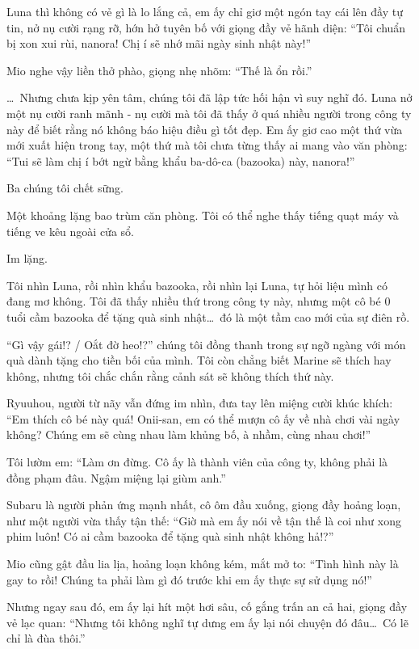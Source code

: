 \documentclass[../main.tex]{subfiles}
\begin{document}

Luna thì không có vẻ gì là lo lắng cả, em ấy chỉ giơ một ngón tay cái lên đầy tự tin, nở nụ cười rạng rỡ, hớn hở tuyên bố với giọng đầy vẻ hãnh diện: ``Tôi chuẩn bị xon xui rùi, nanora! Chị í sẽ nhớ mãi ngày sinh nhật này!''

Mio nghe vậy liền thở phào, giọng nhẹ nhõm: ``Thế là ổn rồi.''

\dots\ Nhưng chưa kịp yên tâm, chúng tôi đã lập tức hối hận vì suy nghĩ đó. Luna nở một nụ cười ranh mãnh - nụ cười mà tôi đã thấy ở quá nhiều người trong công ty này để biết rằng nó không báo hiệu điều gì tốt đẹp. Em ấy giơ cao một thứ vừa mới xuất hiện trong tay, một thứ mà tôi chưa từng thấy ai mang vào văn phòng: ``Tui sẽ làm chị í bớt ngừ bằng khẩu ba-dô-ca (bazooka) này, nanora!''

Ba chúng tôi chết sững.

Một khoảng lặng bao trùm căn phòng. Tôi có thể nghe thấy tiếng quạt máy và tiếng ve kêu ngoài cửa sổ.


Im lặng.

Tôi nhìn Luna, rồi nhìn khẩu bazooka, rồi nhìn lại Luna, tự hỏi liệu mình có đang mơ không. Tôi đã thấy nhiều thứ trong công ty này, nhưng một cô bé 0 tuổi cầm bazooka để tặng quà sinh nhật\dots\ đó là một tầm cao mới của sự điên rồ.

``Gì vậy gái!? / Oắt đờ heo!?'' chúng tôi đồng thanh trong sự ngỡ ngàng với món quà dành tặng cho tiền bối của mình. Tôi còn chẳng biết Marine sẽ thích hay không, nhưng tôi chắc chắn rằng cảnh sát sẽ không thích thứ này.

Ryuuhou, người từ nãy vẫn đứng im nhìn, đưa tay lên miệng cười khúc khích: ``Em thích cô bé này quá! Onii-san, em có thể mượn cô ấy về nhà chơi vài ngày không? Chúng em sẽ cùng nhau làm khủng bố, à nhầm, cùng nhau chơi!''

Tôi lườm em: ``Làm ơn đừng. Cô ấy là thành viên của công ty, không phải là đồng phạm đâu. Ngậm miệng lại giùm anh.''

Subaru là người phản ứng mạnh nhất, cô ôm đầu xuống, giọng đầy hoảng loạn, như một người vừa thấy tận thế: ``Giờ mà em ấy nói về tận thế là coi như xong phim luôn! Có ai cầm bazooka để tặng quà sinh nhật không hả!?''

Mio cũng gật đầu lia lịa, hoảng loạn không kém, mắt mở to: ``Tình hình này là gay to rồi! Chúng ta phải làm gì đó trước khi em ấy thực sự sử dụng nó!''

Nhưng ngay sau đó, em ấy lại hít một hơi sâu, cố gắng trấn an cả hai, giọng đầy vẻ lạc quan: ``Nhưng tôi không nghĩ tự dưng em ấy lại nói chuyện đó đâu\dots\ Có lẽ chỉ là đùa thôi.''
\end{document}
